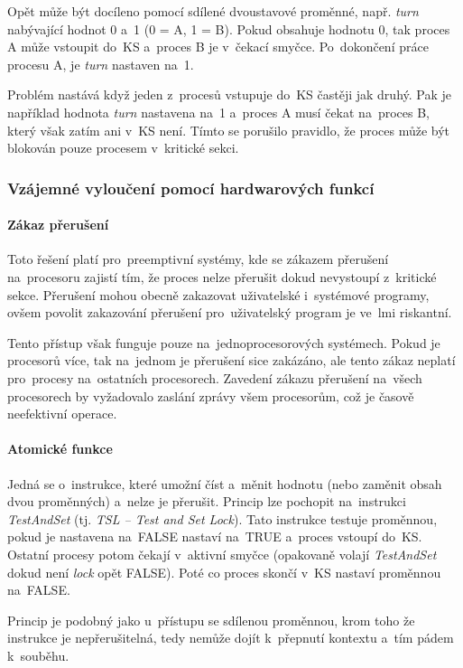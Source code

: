 Opět může být docíleno pomocí sdílené dvoustavové proměnné, např. \emph{turn} nabývající hodnot 0 a~1 (0 = A, 1 = B). Pokud obsahuje hodnotu 0, tak proces A může vstoupit do~KS a~proces B je v~čekací smyčce. Po~dokončení práce procesu A, je \emph{turn} nastaven na~1.

Problém nastává když jeden z~procesů vstupuje do~KS častěji jak druhý. Pak je například hodnota \emph{turn} nastavena na~1 a~proces A musí čekat na~proces B, který však zatím ani v~KS není. Tímto se porušilo pravidlo, že proces může být blokován pouze procesem v~kritické sekci. 

\subsubsection{Vzájemné vyloučení pomocí hardwarových funkcí}

\paragraph{Zákaz přerušení}

Toto řešení platí pro~preemptivní systémy, kde se zákazem přerušení na~procesoru zajistí tím, že proces nelze přerušit dokud nevystoupí z~kritické sekce. Přerušení mohou obecně zakazovat uživatelské i~systémové programy, ovšem povolit zakazování přerušení pro~uživatelský program je ve~lmi riskantní. 

Tento přístup však funguje pouze na~jednoprocesorových systémech. Pokud je procesorů více, tak na~jednom je přerušení sice zakázáno, ale tento zákaz neplatí pro~procesy na~ostatních procesorech. Zavedení zákazu přerušení na~všech procesorech by vyžadovalo zaslání zprávy všem procesorům, což je časově neefektivní operace.

\paragraph{Atomické funkce}

Jedná se o~instrukce, které umožní číst a~měnit hodnotu (nebo zaměnit obsah dvou proměnných) a~nelze je přerušit. Princip lze pochopit na~instrukci \emph{TestAndSet} (tj. \emph{TSL -- Test and Set Lock}). Tato instrukce testuje proměnnou, pokud je nastavena na~FALSE nastaví na~TRUE a~proces vstoupí do~KS. Ostatní procesy potom čekají v~aktivní smyčce (opakovaně volají \emph{TestAndSet} dokud není \emph{lock} opět FALSE). Poté co proces skončí v~KS nastaví proměnnou na~FALSE. 

Princip je podobný jako u~přístupu se sdílenou proměnnou, krom toho že instrukce je nepřerušitelná, tedy nemůže dojít k~přepnutí kontextu a~tím pádem k~souběhu.

